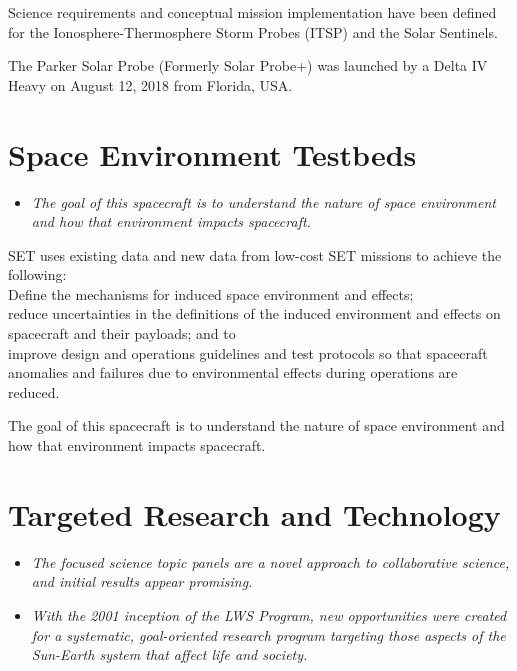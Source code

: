 Science requirements and conceptual mission implementation have been
defined for the Ionosphere-Thermosphere Storm Probes (ITSP) and the
Solar Sentinels.

The Parker Solar Probe (Formerly Solar Probe+) was launched by a Delta
IV Heavy on August 12, 2018 from Florida, USA.

\section{Space Environment Testbeds}\label{space-environment-testbeds}

\begin{itemize}
\item
  \emph{The goal of this spacecraft is to understand the nature of space
  environment and how that environment impacts spacecraft.}
\end{itemize}

SET uses existing data and new data from low-cost SET missions to
achieve the following:\\
Define the mechanisms for induced space environment and effects;\\
reduce uncertainties in the definitions of the induced environment and
effects on spacecraft and their payloads; and to\\
improve design and operations guidelines and test protocols so that
spacecraft anomalies and failures due to environmental effects during
operations are reduced.

The goal of this spacecraft is to understand the nature of space
environment and how that environment impacts spacecraft.

\section{Targeted Research and
Technology}\label{targeted-research-and-technology}

\begin{itemize}
\item
  \emph{The focused science topic panels are a novel approach to
  collaborative science, and initial results appear promising.}
\item
  \emph{With the 2001 inception of the LWS Program, new opportunities
  were created for a systematic, goal-oriented research program
  targeting those aspects of the Sun-Earth system that affect life and
  society.}
\end{itemize}

